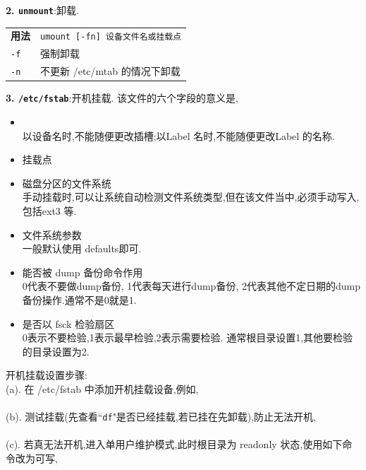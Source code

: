 \par
\textbf{2. \texttt{unmount}}:卸载.
{\kaishu
\begin{longtable}{l@{: }p{}}\hline\hline
\textbf{用法} & \texttt{umount [-fn] 设备文件名或挂载点} \\

  \texttt{-f} & 强制卸载 \\

  \texttt{-n} & 不更新 /etc/mtab 的情况下卸载 \\

  \hline
\end{longtable}
}

\par
\textbf{3. \texttt{/etc/fstab}}:开机挂载.
该文件的六个字段的意义是,
{\kaishu
\begin{itemize}
 \item {}\\以设备名时,不能随便更改插槽;以Label 名时,不能随便更改Label 的名称.

 \item {\songti 挂载点}

 \item {\songti 磁盘分区的文件系统}\\
 手动挂载时,可以让系统自动检测文件系统类型,但在该文件当中,必须手动写入,包括ext3 等.

  \item {\songti 文件系统参数}\\
  一般默认使用 defaults即可.

  \item {\songti 能否被 dump 备份命令作用}\\
  0代表不要做dump备份, 1代表每天进行dump备份, 2代表其他不定日期的dump备份操作.通常不是0就是1.

  \item {\songti 是否以  fsck 检验扇区}\\
  0表示不要检验,1表示最早检验,2表示需要检验. 通常根目录设置1,其他要检验的目录设置为2.
\end{itemize}}
开机挂载设置步骤:\\
(a). 在 /etc/fstab 中添加开机挂载设备,例如,\\
\\
(b). 测试挂载(先查看``\texttt{df}"是否已经挂载,若已挂在先卸载),防止无法开机, \\
\\
(c). 若真无法开机,进入单用户维护模式,此时根目录为 readonly 状态,使用如下命令改为可写,\\
\\

